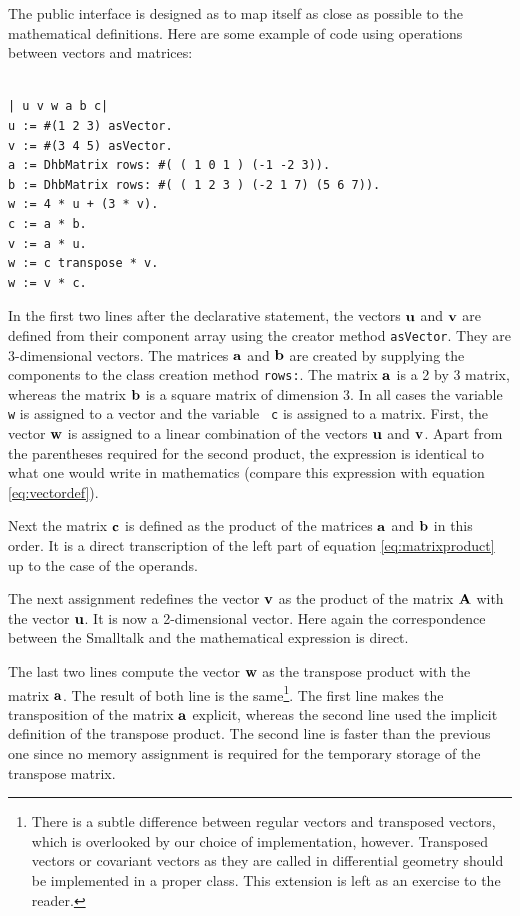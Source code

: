 \documentclass[twoside]{book}
\begin{document}
The public interface is designed as to map itself as close as
possible to the mathematical definitions. Here are some example of
code using operations between vectors and matrices:
\begin{codeExample}
\begin{verbatim}

| u v w a b c|
u := #(1 2 3) asVector.
v := #(3 4 5) asVector.
a := DhbMatrix rows: #( ( 1 0 1 ) (-1 -2 3)).
b := DhbMatrix rows: #( ( 1 2 3 ) (-2 1 7) (5 6 7)).
w := 4 * u + (3 * v).
c := a * b.
v := a * u.
w := c transpose * v.
w := v * c.
\end{verbatim}
\end{codeExample}
In the first two lines after the declarative statement, the
vectors ${\bf u}$ and ${\bf v}$ are defined from their component
array using the creator method {\tt asVector}. They are
3-dimensional vectors. The matrices ${\bf a}$ and ${\bf b}$ are
created by supplying the components to the class creation method
{\tt rows:}. The matrix ${\bf a}$ is a 2 by 3 matrix, whereas the
matrix ${\bf b}$ is a square matrix of dimension 3. In all cases
the variable {\tt w} is assigned to a vector and the variable {\tt
c} is assigned to a matrix. First, the vector ${\bf w}$ is
assigned to a linear combination of the vectors ${\bf u}$ and
${\bf v}$. Apart from the parentheses required for the second
product, the expression is identical to what one would write in
mathematics (compare this expression with equation
\ref{eq:vectordef}).

Next the matrix ${\bf c}$ is defined as the product of the
matrices ${\bf a}$ and ${\bf b}$ in this order. It is a direct
transcription of the left part of equation \ref{eq:matrixproduct}
up to the case of the operands.

The next assignment redefines the vector ${\bf v}$ as the product
of the matrix ${\bf A}$ with the vector ${\bf u}$. It is now a
2-dimensional vector. Here again the correspondence between the
Smalltalk and the mathematical expression is direct.

The last two lines compute the vector ${\bf w}$ as the transpose
product with the matrix ${\bf a}$. The result of both line is the
same\footnote{\label{ft:covariant}There is a subtle difference
between regular vectors and transposed vectors, which is
overlooked by our choice of implementation, however. Transposed
vectors or covariant vectors as they are called in differential
geometry should be implemented in a proper class. This extension
is left as an exercise to the reader.}. The first line makes the
transposition of the matrix ${\bf a}$ explicit, whereas the second
line used the implicit definition of the transpose product. The
second line is faster than the previous one since no memory
assignment is required for the temporary storage of the transpose
matrix.
\end{document}

